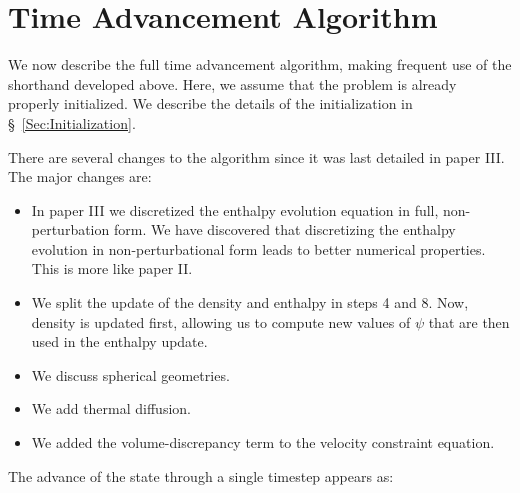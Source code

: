 \section{Time Advancement Algorithm}

We now describe the full time advancement algorithm, making frequent
use of the shorthand developed above.  Here, we assume that the
problem is already properly initialized.  We describe the details of
the initialization in \S~\ref{Sec:Initialization}.

There are several changes to the algorithm since it was last detailed
in paper III.  The major changes are:
\begin{itemize}
\item In paper III we discretized the enthalpy evolution equation in
full, non-perturbation form.  We have discovered that discretizing the
enthalpy evolution in non-perturbational form leads to better
numerical properties.  This is more like paper II.

\item We split the update of the density and enthalpy in steps 4 and 8.
Now, density is updated first, allowing us to compute new values of 
$\psi$ that are then used in the enthalpy update.

\item We discuss spherical geometries.

\item We add thermal diffusion.

\item We added the volume-discrepancy term to the velocity constraint
equation.
\end{itemize}
%
The advance of the state through a single timestep appears as:


